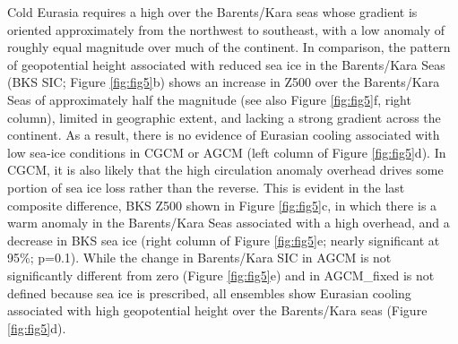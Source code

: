 \documentclass{nature}
\begin{document}
Cold Eurasia requires a high over the Barents/Kara seas whose gradient is oriented approximately from the northwest to southeast, with a low anomaly of roughly equal magnitude over much of the continent. In comparison, the pattern of geopotential height associated with reduced sea ice in the Barents/Kara Seas (BKS SIC; Figure \ref{fig:fig5}b) shows an increase in Z500 over the Barents/Kara Seas of approximately half the magnitude (see also Figure \ref{fig:fig5}f, right column), limited in geographic extent, and lacking a strong gradient across the continent. As a result, there is no evidence of Eurasian cooling associated with low sea-ice conditions in CGCM or AGCM (left column of Figure \ref{fig:fig5}d). In CGCM, it is also likely that the high circulation anomaly overhead drives some portion of sea ice loss rather than the reverse. This is evident in the last composite difference, BKS Z500 shown in Figure \ref{fig:fig5}c, in which there is a warm anomaly in the Barents/Kara Seas associated with a high overhead, and a decrease in BKS sea ice (right column of Figure \ref{fig:fig5}e; nearly significant at 95\%; p=0.1). While the change in Barents/Kara SIC in AGCM is not significantly different from zero (Figure \ref{fig:fig5}e) and in AGCM\_fixed is not defined because sea ice is prescribed, all ensembles show Eurasian cooling associated with high geopotential height over the Barents/Kara seas (Figure \ref{fig:fig5}d).





\end{document}
